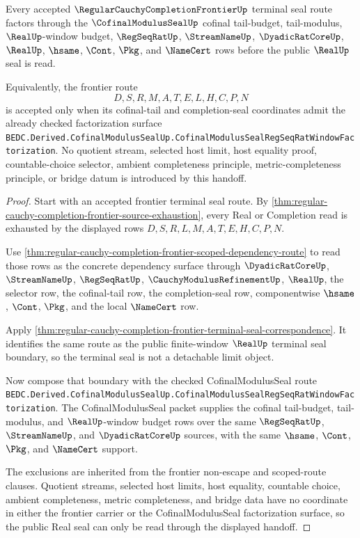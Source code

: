 \begin{theorem}
\label{thm:regular-cauchy-completion-frontier-cofinal-modulus-seal-handoff}
Every accepted $\RegularCauchyCompletionFrontierUp$ terminal seal route factors through the $\CofinalModulusSealUp$ cofinal tail-budget, tail-modulus, $\RealUp$-window budget, $\RegSeqRatUp$, $\StreamNameUp$, $\DyadicRatCoreUp$, $\RealUp$, $\hsame$, $\Cont$, $\Pkg$, and $\NameCert$ rows before the public $\RealUp$ seal is read.

Equivalently, the frontier route
$$
D,S,R,M,A,T,E,L,H,C,P,N
$$
is accepted only when its cofinal-tail and completion-seal coordinates admit the already checked factorization surface
\texttt{BEDC.Derived.CofinalModulusSealUp.CofinalModulusSealRegSeqRatWindowFactorization}.
No quotient stream, selected host limit, host equality proof, countable-choice selector, ambient completeness principle, metric-completeness principle, or bridge datum is introduced by this handoff.
\end{theorem}
\begin{proof}
Start with an accepted frontier terminal seal route. By \autoref{thm:regular-cauchy-completion-frontier-source-exhaustion}, every Real or Completion read is exhausted by the displayed rows $D,S,R,L,M,A,T,E,H,C,P,N$.

Use \autoref{thm:regular-cauchy-completion-frontier-scoped-dependency-route} to read those rows as the concrete dependency surface through $\DyadicRatCoreUp$, $\StreamNameUp$, $\RegSeqRatUp$, $\CauchyModulusRefinementUp$, $\RealUp$, the selector row, the cofinal-tail row, the completion-seal row, componentwise $\hsame$, $\Cont$, $\Pkg$, and the local $\NameCert$ row.

Apply \autoref{thm:regular-cauchy-completion-frontier-terminal-seal-correspondence}. It identifies the same route as the public finite-window $\RealUp$ terminal seal boundary, so the terminal seal is not a detachable limit object.

Now compose that boundary with the checked CofinalModulusSeal route \texttt{BEDC.Derived.CofinalModulusSealUp.CofinalModulusSealRegSeqRatWindowFactorization}. The CofinalModulusSeal packet supplies the cofinal tail-budget, tail-modulus, and $\RealUp$-window budget rows over the same $\RegSeqRatUp$, $\StreamNameUp$, and $\DyadicRatCoreUp$ sources, with the same $\hsame$, $\Cont$, $\Pkg$, and $\NameCert$ support.

The exclusions are inherited from the frontier non-escape and scoped-route clauses. Quotient streams, selected host limits, host equality, countable choice, ambient completeness, metric completeness, and bridge data have no coordinate in either the frontier carrier or the CofinalModulusSeal factorization surface, so the public Real seal can only be read through the displayed handoff.
\end{proof}


